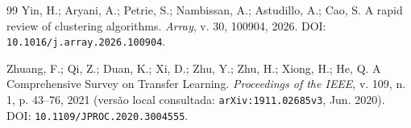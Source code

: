 \documentclass[11pt,a4paper]{article}
\begin{document}
\begin{thebibliography}{99}
Yin, H.; Aryani, A.; Petrie, S.; Nambissan, A.; Astudillo, A.; Cao, S. A rapid review of clustering algorithms. \emph{Array}, v. 30, 100904, 2026. DOI: \texttt{10.1016/j.array.2026.100904}.

Zhuang, F.; Qi, Z.; Duan, K.; Xi, D.; Zhu, Y.; Zhu, H.; Xiong, H.; He, Q. A Comprehensive Survey on Transfer Learning. \emph{Proceedings of the IEEE}, v. 109, n. 1, p. 43--76, 2021 (versão local consultada: \texttt{arXiv:1911.02685v3}, Jun. 2020). DOI: \texttt{10.1109/JPROC.2020.3004555}.

\end{thebibliography}
\end{document}
